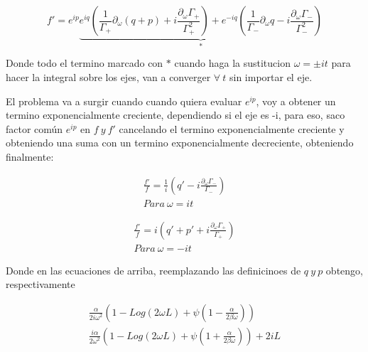 \begin{equation}
    f' = 
    e^ {i p}
    \underbrace
    {
    e ^{i q}
    \left(
    \frac{1}{\Gamma _{+}}  \partial _{\omega} (q+p)
    + i 
    \frac
    {\partial _{\omega} \Gamma _{+} }
    {\Gamma _{+} ^2}
    \right)    +
    e^ {-i q}
    \left(
    \frac{1}{\Gamma _{-}}  \partial _{\omega} q
    - i 
    \frac
    {\partial _{\omega} \Gamma _{-} }
    {\Gamma _{-} ^2}
    \right)
    } _{*}
\end{equation}

Donde todo el termino marcado con  $*$ cuando haga la sustitucion $\omega = \pm i t$ para hacer la integral sobre los ejes, van a converger $\forall \ t$ sin importar el eje.

El problema va a surgir cuando cuando quiera evaluar $e ^{i p}$, voy a obtener un termino exponencialmente creciente, dependiendo si el eje es -i, para eso, saco factor común $e ^{i p}$ en $f \ y \ f'$ cancelando el termino exponencialmente creciente y obteniendo una suma con un termino exponencialmente decreciente, obteniendo finalmente:

\begin{equation}
\begin{array}{c}
    \frac{f'}{f} = \frac{1}{i} 
    \left(
    q' - i 
    \frac
    {\partial _{\omega} \Gamma _{-} }
    {\Gamma _{-}}
    \right)
    \\
    Para \ \omega = i t 
\end{array}
\end{equation}
    
\begin{equation}
\begin{array}{c}
    \frac{f'}{f} = i 
    \left(
    q'+p' + i 
    \frac
    {\partial _{\omega} \Gamma _{+} }
    {\Gamma _{+}}
    \right)
    \\
    Para \ \omega = - i t 
\end{array}
\end{equation}
    
Donde en las ecuaciones de arriba, reemplazando las definicinoes de $q \ y \ p$ obtengo, respectivamente

\begin{equation}
\begin{array}{c}
    \frac{\alpha}{2 i \omega ^2}
    \left(
    1 - Log(2 \omega L ) + \psi (1-\frac{\alpha}{2 \beta \omega})
    \right) \\
    \frac{i \alpha}{2 \omega ^2}
    \left(
    1 - Log(2 \omega L ) + \psi  (1  + \frac{\alpha}{2 \beta \omega})
    \right) + 
    2 i L
\end{array}
\end{equation}

